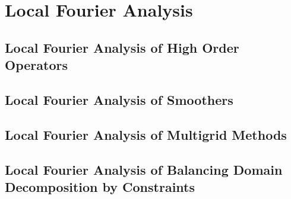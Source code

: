 \chapter{Local Fourier Analysis}\label{ch:LocalFourierAnalysis}


\section{Local Fourier Analysis of High Order Operators}\label{sec:lfahighorder}


\section{Local Fourier Analysis of Smoothers}\label{sec:lfasmoothers}


\section{Local Fourier Analysis of Multigrid Methods}\label{sec:lfamultigrid}


\section{Local Fourier Analysis of Balancing Domain Decomposition by Constraints}\label{sec:lfabddc}

